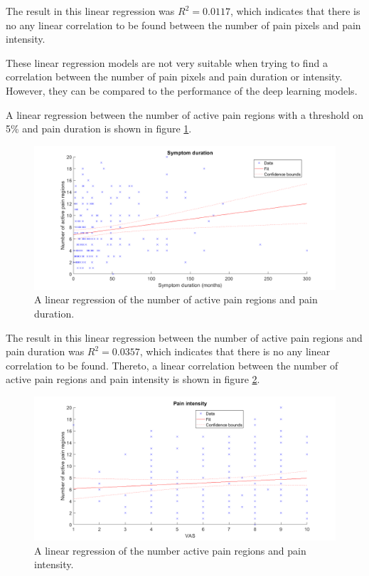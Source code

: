 \noindent
The result in this linear regression was $R^2=0.0117$, which indicates that there is no any linear correlation to be found between the number of pain pixels and pain intensity.\newline

\noindent
These linear regression models are not very suitable when trying to find a correlation between the number of pain pixels and pain duration or intensity. However, they can be compared to the performance of the deep learning models.




\noindent
A linear regression between the number of active pain regions with a threshold on 5\% and pain duration is shown in figure \ref{fig:regDuration}. \newline

\begin{figure} [H]
\centering
\includegraphics[width=1\textwidth]{figures/regionsRegressionDuration}
\caption{A linear regression of the number of active pain regions and pain duration.}
\label{fig:regDuration}
\end{figure}

\noindent
The result in this linear regression between the number of active pain regions and pain duration was $R^2=0.0357$, which indicates that there is no any linear correlation to be found.\newline
Thereto, a linear correlation between the number of active pain regions and pain intensity is shown in figure \ref{fig:regPain}.

\begin{figure} [H]
\centering
\includegraphics[width=1\textwidth]{figures/regionsRegressionPain}
\caption{A linear regression of the number active pain regions and pain intensity.}
\label{fig:regPain}
\end{figure}

